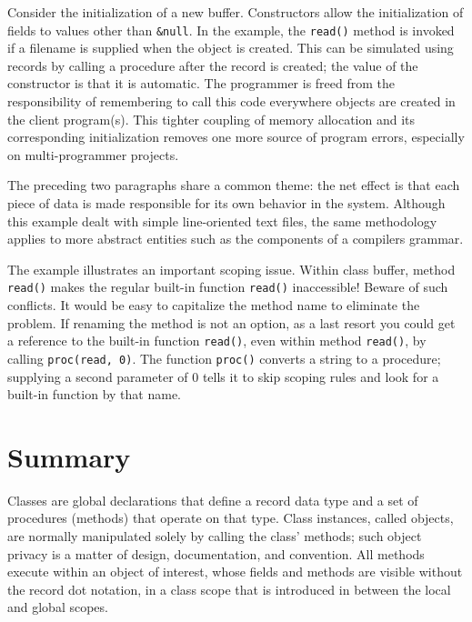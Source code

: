 Consider the initialization of a new buffer. Constructors allow the
initialization of fields to values other than \texttt{\&null}. In the
example, the \texttt{read()} method is invoked if a filename is
supplied when the object is created. This can be simulated using
records by calling a procedure after the record is created; the value
of the constructor is that it is automatic.
The programmer is freed from the responsibility of remembering to call
this code everywhere objects are created in the client program(s). This
tighter coupling of memory allocation and its
corresponding initialization removes one more source of program errors,
especially on multi-programmer projects. 

The preceding two paragraphs share a common theme:
the net effect is that each piece of data is made responsible for its
own behavior in the system. Although this example dealt with simple
line-oriented text files, the same methodology applies to more abstract
entities such as the components of a
compiler{\textquotesingle}s grammar.

The example illustrates an important scoping issue. Within class
buffer, method \texttt{read()} makes the regular built-in
function \texttt{read()} inaccessible! Beware of such
conflicts. It would be easy to capitalize the method name to
eliminate the problem. If renaming the method is not an option, as a
last resort you could get a reference to the built-in function
\texttt{read()}, even within method \texttt{read()}, by calling
\texttt{proc({\textquotedbl}read{\textquotedbl}, 0)}. The function
\texttt{proc()} converts a string to a procedure; supplying a second
parameter of 0 tells it to skip scoping rules and look for a built-in
function by that name.

\section*{Summary}

Classes are global declarations that define a record data type and a
set of procedures (methods) that operate on that type. Class instances,
called objects, are normally manipulated solely by calling
the class' methods; such object privacy is a matter of
design, documentation, and
convention. All methods execute within an
object of interest, whose fields and methods are visible
without the record dot notation, in a
class scope that is introduced in between the local and global scopes.




\bigskip
